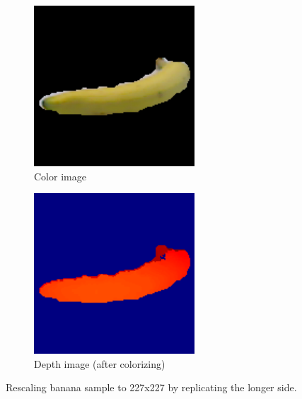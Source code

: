 \documentclass[paper=letter, fontsize=12pt]{article}
\begin{document}
\begin{figure}[htbp]
	\centering
	\begin{subfigure}[b]{0.32\linewidth}
		\includegraphics[width=\textwidth]{banana_1_1_1_resize}
		\caption{Color image}
	\end{subfigure}
	\begin{subfigure}[b]{0.32\linewidth}
		\includegraphics[width=\textwidth]{banana_1_1_1_depth_resize}
		\caption{Depth image (after colorizing)}
	\end{subfigure}
	\caption{Rescaling banana sample to 227x227 by replicating the longer side.}
	\label{fig:banana_resize}
\end{figure}
\end{document}

